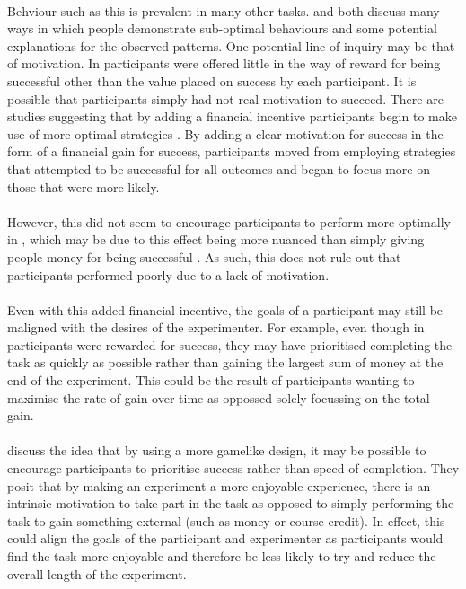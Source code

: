 \documentclass[12pt]{article}
\begin{document}
\paragraph{} Behviour such as this is prevalent in many other tasks. \cite{KahnemanChoicesValuseFrames} and \cite{Gigerenzer2011} both discuss many ways in which people demonstrate sub-optimal behaviours and some potential explanations for the observed patterns. One potential line of inquiry may be that of motivation. In \cite{clarke2015failure} participants were offered little in the way of reward for being successful other than the value placed on success by each participant. It is possible that participants simply had not real motivation to succeed. There are studies suggesting that by adding a financial incentive participants begin to make use of more optimal strategies \citep{Goodnow1955,phillips1966conservatism}. By adding a clear motivation for success in the form of a financial gain for success, participants moved from employing strategies that attempted to be successful for all outcomes and began to focus more on those that were more likely.

\paragraph{} However, this did not seem to encourage participants to perform more optimally in \cite{morvan2012human}, which may be due to this effect being more nuanced than simply giving people money for being successful \citep{Camerer1999}. As such, this does not rule out that participants performed poorly due to a lack of motivation. 

\paragraph{} Even with this added financial incentive, the goals of a participant may still be maligned with the desires of the experimenter. For example, even though in \cite{morvan2012human} participants were rewarded for success, they may have prioritised completing the task as quickly as possible rather than gaining the largest sum of money at the end of the experiment. This could be the result of participants wanting to maximise the rate of gain over time as oppossed solely focussing on the total gain.

\paragraph{} \cite{miranda2014intrinsic} discuss the idea that by using a more gamelike design, it may be possible to encourage participants to prioritise success rather than speed of completion. They posit that by making an experiment a more enjoyable experience, there is an intrinsic motivation to take part in the task as opposed to simply performing the task to gain something external (such as money or course credit). In effect, this could align the goals of the participant and experimenter as participants would find the task more enjoyable and therefore be less likely to try and reduce the overall length of the experiment. %
\end{document}
